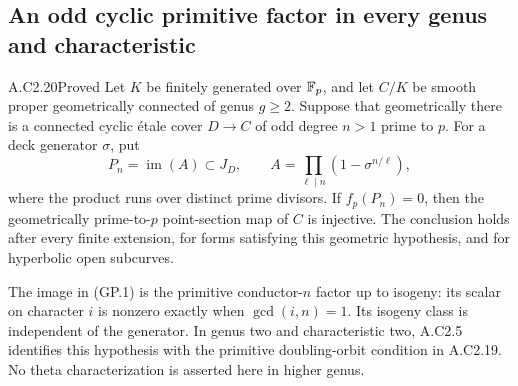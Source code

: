 \subsection{An odd cyclic primitive factor in every genus and characteristic}

\begin{claim}{A.C2.20}{Proved}
Let $K$ be finitely generated over $\mathbb F_p$, and let
$C/K$ be smooth proper geometrically connected of
genus $g\ge2$. Suppose that geometrically there is
a connected cyclic \'etale cover $D\to C$ of odd
degree $n>1$ prime to $p$. For a deck generator
$\sigma$, put
\[
 P_n=\operatorname{im}(A)\subset J_D,\qquad
                 A=\prod_{\ell\mid n}(1-\sigma^{n/\ell}),
                                                               \tag{GP.1}
\]
where the product runs over distinct prime divisors.
If $f_p(P_n)=0$, then the geometrically prime-to-$p$
point-section map of $C$ is injective.
The conclusion holds after every finite extension,
for forms satisfying this geometric hypothesis,
and for hyperbolic open subcurves.

The image in (GP.1) is the primitive conductor-$n$
factor up to isogeny: its scalar on character $i$
is nonzero exactly when $\gcd(i,n)=1$.
Its isogeny class is independent of the generator.
In genus two and characteristic two, A.C2.5
identifies this hypothesis with the primitive
doubling-orbit condition in A.C2.19.
No theta characterization is asserted here in
higher genus.
\end{claim}
